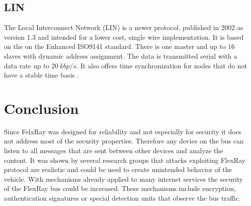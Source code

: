 \documentclass{latex4ei/latex4ei_report}		%
\begin{document}
    \subsection{LIN}
    The Local Interconnect Network (LIN) is a newer protocol, published in 2002 as version 1.3 and intended for a lower cost, single wire implementation. It is based on the on the Enhanced ISO9141 standard. There is one master and up to 16 slaves with dynamic address assignment. The data is transmitted serial with a data rate up to $\SI{20}{kbp/s}$. It also offers time synchronization for nodes that do not have a stable time basis \cite{edn}.



\section{Conclusion}
Since FelxRay was designed for reliability and not especially for security it does not address most of the security properties. Therefore any device on the bus can listen to all messages that are sent between other devices and analyze the content. It was shown by several research groups that attacks exploiting FlexRay protocol are realistic and could be used to create unintended behavior of the vehicle.
With mechanisms already applied to many internet services the security of the FlexRay bus could be increased. These mechanisms include encryption, authentication signatures or special detection units that observe the bus traffic.
\end{document}
